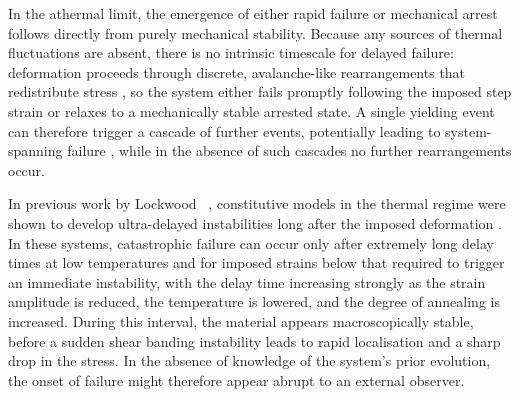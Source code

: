 \documentclass[asymmetricmargins]{library/duthesis}%
\begin{document}
In the athermal limit, the emergence of either rapid failure or mechanical arrest follows directly from purely mechanical stability. Because any sources of thermal fluctuations are absent, there is no intrinsic timescale for delayed failure: deformation proceeds through discrete, avalanche-like rearrangements that redistribute stress \cite{nicolas_deformation_2018,agoritsas_relevance_2015,ness_oscillatory_2017,lin_hydrodynamic_2015}, so the system either fails promptly following the imposed step strain or relaxes to a mechanically stable arrested state. A single yielding event can therefore trigger a cascade of further events, potentially leading to system-spanning failure \cite{barlow_ductile_2020}, while in the absence of such cascades no further rearrangements occur.


In previous work by Lockwood \etal~\cite{lockwood_ultradelayed_2025}, constitutive models in the thermal regime were shown to develop ultra-delayed instabilities long after the imposed deformation \cite{lockwood_ultradelayed_2025}. In these systems, catastrophic failure can occur only after extremely long delay times at low temperatures and for imposed strains below that required to trigger an immediate instability, with the delay time increasing strongly as the strain amplitude is reduced, the temperature is lowered, and the degree of annealing is increased. During this interval, the material appears macroscopically stable, before a sudden shear banding instability leads to rapid localisation and a sharp drop in the stress. In the absence of knowledge of the system’s prior evolution, the onset of failure might therefore appear abrupt to an external observer.
\end{document}
